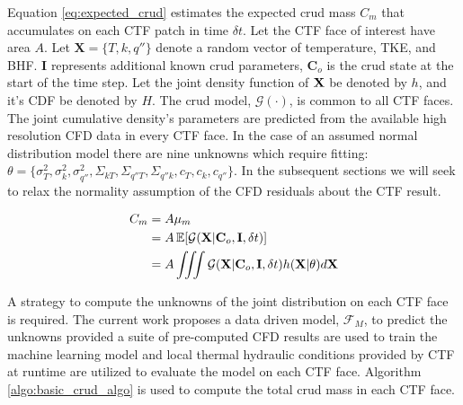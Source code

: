 Equation \ref{eq:expected_crud} estimates the expected crud mass $C_m$ that accumulates on each CTF patch in time $\delta t$.  Let the CTF face of interest have area $A$.  Let $\mathbf X= \{T, k, q''\}$ denote a random vector of temperature, TKE, and BHF. $\mathbf I$ represents additional known crud parameters, $\mathbf C_o$ is the crud state at the start of the time step.  Let the joint density function of $\bf X$ be denoted by $h$, and it's CDF be denoted by $H$.  The crud model, $\mathcal G(\cdot)$, is common to all CTF faces.  The joint cumulative density's parameters are predicted from the available high resolution CFD data in every CTF face.  In the case of an assumed normal distribution model there are nine unknowns which require fitting:  $\theta = \{ \sigma^2_T, \sigma^2_k, \sigma^2_{q''}, \Sigma_{kT}, \Sigma_{q''T}, \Sigma_{q''k}, c_T, c_k, c_{q''} \}$.  In the subsequent sections we will seek to relax the normality assumption of the CFD residuals about the CTF result.

\begin{align}
        C_m &= A \mu_{m} \nonumber \\
        &= A \operatorname*{\mathbb{E}}[\mathcal G(\mathbf X|\mathbf C_o, \mathbf I, \delta t)] \nonumber \\
        &= A \iiint \mathcal G(\mathbf X|\mathbf C_o, \mathbf I, \delta t) h(\mathbf X|\theta) d \mathbf X
        \label{eq:expected_crud}
\end{align}

A strategy to compute the unknowns of the joint distribution on each CTF face is required.  The current work proposes a data driven model, $\mathcal F_M$, to predict the unknowns provided a suite of pre-computed CFD results are used to train the machine learning model and local thermal hydraulic conditions provided by CTF at runtime are utilized to evaluate the model on each CTF face. Algorithm \ref{algo:basic_crud_algo} is used to compute the total crud mass in each CTF face.

